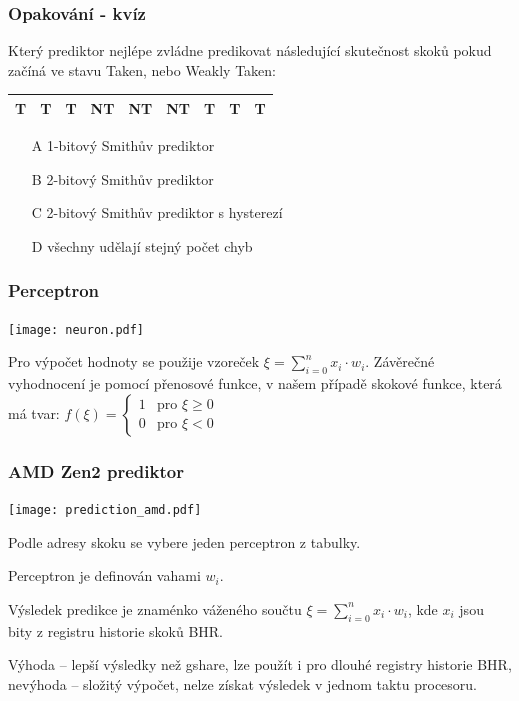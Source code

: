 \documentclass{beamer}
\begin{document}
\begin{frame}
\frametitle{Opakování - kvíz}

Který prediktor nejlépe zvládne predikovat následující skutečnost skoků pokud začíná ve stavu Taken, nebo Weakly Taken:

\begin{tabular}{|c|c|c|c|c|c|c|c|c|}\hline
T & T & T & NT & NT & NT& T & T & T \\ \hline
\end{tabular}

\bigskip
\begin{itemize}
 \item[A] 1-bitový Smithův prediktor
 \item[B] 2-bitový Smithův prediktor
 \item[C] 2-bitový Smithův prediktor s hysterezí
 \item[D] všechny udělají stejný počet chyb
\end{itemize}
\end{frame}


\begin{frame}
\frametitle{Perceptron}

\begin{center}
\texttt{[image: neuron.pdf]}
\end{center}

Pro výpočet hodnoty se použije vzoreček $\xi = \sum_{i=0}^{n} x_i \cdot w_i$. Závěrečné vyhodnocení je pomocí přenosové funkce, v našem případě skokové funkce, která má tvar:
$f(\xi) = \begin{cases}1& \text{pro } \xi \ge 0\\0& \text{pro }\xi <0\end{cases}$ 
\end{frame}


\begin{frame}
\frametitle{AMD Zen2 prediktor}

\begin{center}
\texttt{[image: prediction\_amd.pdf]}
\end{center}

Podle adresy skoku se vybere jeden perceptron z tabulky. 

Perceptron je definován vahami $w_i$. 

Výsledek predikce je znaménko váženého součtu $\xi = \sum_{i=0}^{n} x_i \cdot w_i$, kde $x_i$ jsou bity z registru historie skoků BHR.

Výhoda -- lepší výsledky než gshare, lze použít i pro dlouhé registry historie BHR, nevýhoda -- složitý výpočet, nelze získat výsledek v jednom taktu procesoru.
\end{frame}
\end{document}
